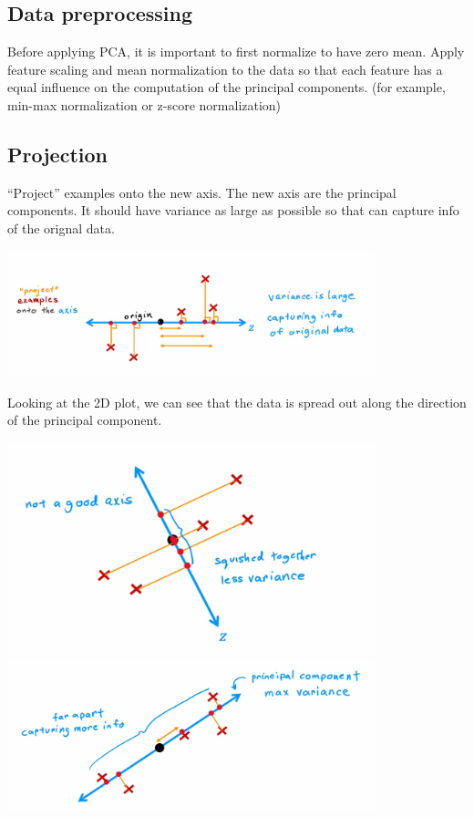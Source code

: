 \subsection*{Data preprocessing}
Before applying PCA, it is important to first normalize to have zero mean.
Apply feature scaling and mean normalization to the data so that each feature has a equal influence on the computation of the principal components.
(for example, min-max normalization or z-score normalization)
\subsection*{Projection}
``Project'' examples onto the new axis.
The new axis are the principal components.
It should have variance as large as possible so that can capture info of the orignal data.
\begin{center}
    \includegraphics*[width=0.8\textwidth]{images/p1}
\end{center}
\par
Looking at the 2D plot, we can see that the data is spread out along the direction of the principal component.
\begin{center}
    \includegraphics*[width=0.8\textwidth]{images/p2}
    \includegraphics*[width=0.8\textwidth]{images/p3}
\end{center}
\par

